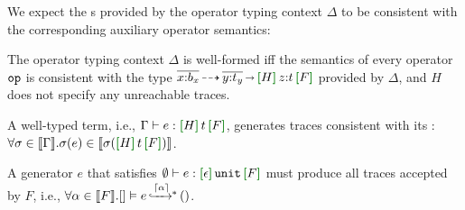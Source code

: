 We expect the \tyName{}s provided by the operator typing context
$\Delta$ to be consistent with the corresponding auxiliary operator
semantics:
\begin{definition}
  \label{lemma:built-in-typing}
  The operator typing context $\Delta$ is well-formed
  iff the semantics of every operator $\boldsymbol{{\tt op}}$ is
  consistent with the type $\overline{x{:}b_{\I{x}}}\garr
  \overline{y{:}t_{\I{y}}}\sarr \uhat{H}{z{:}t}{F}$ provided by $\Delta$, and $H$
  does not specify any unreachable traces.
  \vspace{-.4cm} \par{} \vspace{-.4cm} \par\nobreak\noindent
\end{definition}

\begin{theorem}
  \label{theorem:fundamental} A well-typed term, i.e.,
  \(\Gamma\vdash e : \uhat{H}{t}{F}\), generates traces consistent
  with its \tyName:
  $\forall \sigma \in \denotation{\Gamma}. \sigma(e) \in
  \denotation{\sigma(\uhat{H}{t}{F})}$.
\end{theorem}

\begin{corollary}
  \label{theorem:sound} A generator \(e\) that satisfies
  \(\emptyset \vdash e : \uhat{\epsilon}{\Unit}{F}\) must produce all
  traces accepted by $F$, i.e.,
  $\forall \alpha \in
  \llbracket {F} \rrbracket. {[]}\vDash{e}{\,\xhookrightarrow{\lceil {\alpha} \rceil}\,\hspace{-5pt}^*\,}{()}$.
\end{corollary}
